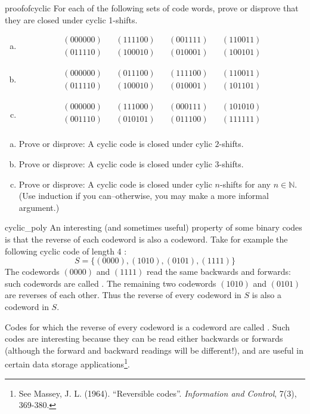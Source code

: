 \begin{exercise}{proofofcyclic}
For each of the following sets of code words, prove or disprove that they are closed under cyclic 1-shifts.  
\begin{enumerate}[(a)]
\item
\[\begin{array}{ccccccc}
(000000) & & (111100) & & (001111) & & (110011)\\
(011110) & & (100010) & & (010001) & & (100101)
\end{array}\]
\item
\[\begin{array}{ccccccc}
(000000) & & (011100) & & (111100) & & (110011) \\
(011110) & & (100010) & & (010001) & & (101101)
\end{array}\]
\item
\[\begin{array}{ccccccc}
(000000) & & (111000) & & (000111) & & (101010) \\
(001110) & & (010101) & &(011100) & & (111111) \\
\end{array}\]
\end {enumerate}
\end {exercise}

\begin{exercise} {}
\begin{enumerate}[(a)]
\item
Prove or disprove: A cyclic code is closed under cylic $2$-shifts.
\item
Prove or disprove: A cyclic code is closed under cylic $3$-shifts.
\item
Prove or disprove: A cyclic code is closed under cylic $n$-shifts for any $n \in \mathbb{N}$. (Use induction if you can--otherwise, you may make a more informal argument.)
\end{enumerate}
\end {exercise}

\begin{example}{cyclic_poly}
An interesting (and sometimes useful) property of some binary codes is that the reverse of each codeword is also a codeword. 
Take for example the following cyclic  code of length 4 :
 \[S = \{(0000),(1010),(0101),(1111)\}\]  
The codewords $(0000)$ and $(1111)$ read the same backwards and forwards: such codewords are called . The remaining two codewords $(1010)$ and $(0101)$ are reverses of each other. Thus the reverse of every codeword in $S$ is also a codeword in $S$.

Codes for which the reverse of every codeword is a codeword are called .  Such codes are interesting because they can be read either backwards or forwards (although the forward and backward readings will be different!), and are useful in certain data storage applications\footnote{See Massey, J. L. (1964). ``Reversible codes''. \textit{Information and Control}, 7(3), 369-380.}.  
\end {example}

